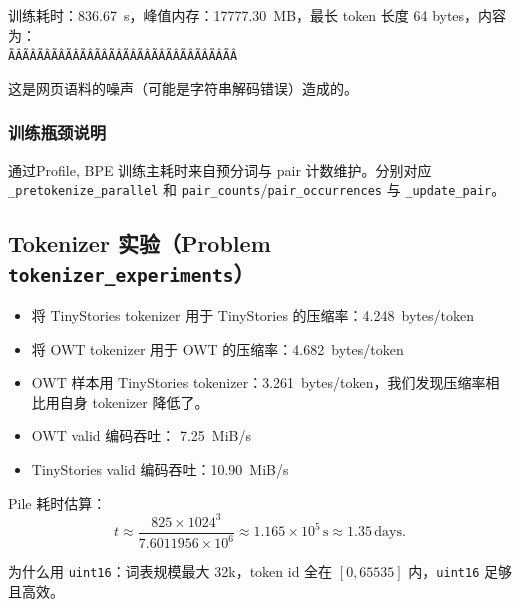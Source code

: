 \documentclass[UTF8,11pt,a4paper]{ctexart}
\begin{document}
训练耗时：\SI{836.67}{s}，峰值内存：\SI{17777.30}{MB}，最长 token 长度 64 bytes，内容为：\\
\texttt{ÃÂÃÂÃÂÃÂÃÂÃÂÃÂÃÂÃÂÃÂÃÂÃÂÃÂÃÂÃÂÃÂ}

这是网页语料的噪声（可能是字符串解码错误）造成的。

\subsubsection{训练瓶颈说明}

通过Profile, BPE 训练主耗时来自预分词与 pair 计数维护。分别对应 \texttt{\_pretokenize\_parallel} 和 \texttt{pair\_counts}/\texttt{pair\_occurrences} 与 \texttt{\_update\_pair}。

\subsection{Tokenizer 实验（Problem \texttt{tokenizer\_experiments}）}

\begin{itemize}
  \item 将 TinyStories tokenizer 用于 TinyStories 的压缩率：\SI{4.248}{bytes/token}
  \item 将 OWT tokenizer 用于 OWT 的压缩率：\SI{4.682}{bytes/token}
  \item OWT 样本用 TinyStories tokenizer：\SI{3.261}{bytes/token}，我们发现压缩率相比用自身 tokenizer 降低了。
  \item OWT valid 编码吞吐： \SI{7.25}{MiB/s}
  \item TinyStories valid 编码吞吐：\SI{10.90}{MiB/s}
\end{itemize}

Pile 耗时估算：
\[
  t \approx \frac{825\times 1024^3}{7.6011956\times 10^6} \approx 1.165\times 10^5\,\text{s}
  \approx 1.35\,\text{days}.
\]

为什么用 \texttt{uint16}：词表规模最大 32k，token id 全在 \([0,65535]\) 内，\texttt{uint16} 足够且高效。



% 
\end{document}
